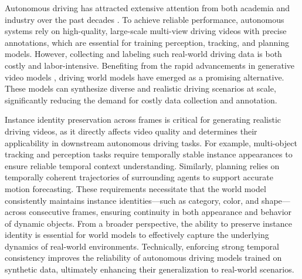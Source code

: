 \documentclass{article} %
\begin{document}
Autonomous driving has attracted extensive attention from both academia and industry over the past decades \cite{shi2016uniad, zheng2024genad, chen2024end, jiang2023vad}. 
To achieve reliable performance, autonomous systems rely on high-quality, large-scale multi-view driving videos with precise annotations, which are essential for training perception, tracking, and planning models. 
However, collecting and labeling such real-world driving data is both costly and labor-intensive. 
Benefiting from the rapid advancements in generative video models \cite{lei2023pyramidflow, xi2025sparse, zheng2024open, hacohen2024ltx, wang2024qihoo, gao2024ca2, zhou2024allegro, ho2022video, blattmann2023align, hu2024animate, wang2023modelscope, wang2024lavie, bar2024lumiere, gupta2024photorealistic}, driving world models \cite{drivedreamer2, wen2024panacea, jia2023adriver, wang2023drive, gao2024magicdrivedithighresolutionlongvideo} have emerged as a promising alternative. 
These models can synthesize diverse and realistic driving scenarios at scale, significantly reducing the demand for costly data collection and annotation.



Instance identity preservation across frames is critical for generating realistic driving videos, 
as it directly affects video quality \cite{Thomas2018fvd} and determines their applicability in downstream autonomous driving tasks. 
For example, multi-object tracking \cite{streampetr} and perception tasks \cite{streampetr} require temporally stable instance appearances to ensure reliable temporal context understanding. 
Similarly, planning \cite{hu2023planningorientedautonomousdriving} relies on temporally coherent trajectories of surrounding agents to support accurate motion forecasting. 
These requirements necessitate that the world model consistently maintains instance identities---such as category, color, and shape---across consecutive frames, ensuring continuity in both appearance and behavior of dynamic objects. 
From a broader perspective, the ability to preserve instance identity is essential for world models to effectively capture the underlying dynamics of real-world environments. 
Technically, enforcing strong temporal consistency improves the reliability of autonomous driving models trained on synthetic data, ultimately enhancing their generalization to real-world scenarios.
\end{document}
